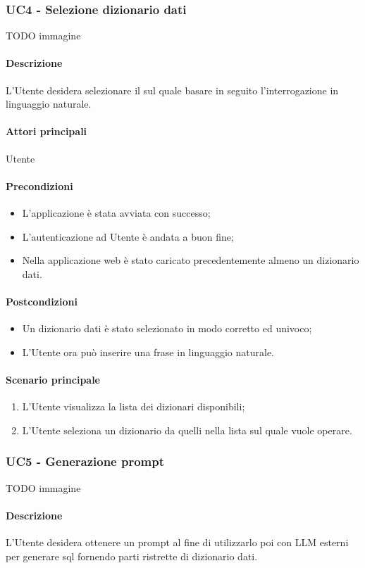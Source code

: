 \subsubsection{UC4 - Selezione dizionario dati}\label{UC4}
TODO immagine\paragraph*{Descrizione}
L’Utente desidera selezionare il  sul quale basare in seguito l’interrogazione in linguaggio naturale.
\paragraph*{Attori principali} Utente

\paragraph*{Precondizioni}
\begin{itemize}
  \item L'applicazione è stata avviata con successo;
  \item L’autenticazione ad Utente è andata a buon fine;
  \item Nella applicazione web è stato caricato precedentemente almeno un dizionario dati.
\end{itemize}

\paragraph*{Postcondizioni}
\begin{itemize}
  \item Un dizionario dati è stato selezionato in modo corretto ed univoco;
  \item L’Utente ora può inserire una frase in linguaggio naturale.
\end{itemize}

\paragraph*{Scenario principale}
\begin{enumerate}
  \item L’Utente visualizza la lista dei dizionari disponibili;
  \item L’Utente seleziona un dizionario da quelli nella lista sul quale vuole operare.
\end{enumerate}


\subsubsection{UC5 - Generazione prompt}\label{UC5}
TODO immagine\paragraph*{Descrizione}
L’Utente desidera ottenere un prompt al fine di utilizzarlo poi con LLM esterni per generare  sql fornendo parti ristrette di dizionario dati.

